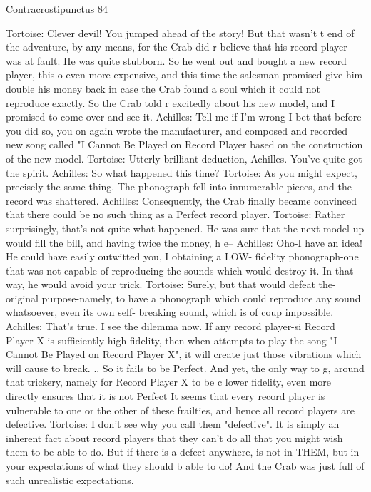 Contracrostipunctus                                                                       84

Tortoise: Clever devil! You jumped ahead of the story! But that wasn't t end of the
       adventure, by any means, for the Crab did r believe that his record player was at
       fault. He was quite stubborn. So he went out and bought a new record player, this
       o even more expensive, and this time the salesman promised give him double his
       money back in case the Crab found a soul which it could not reproduce exactly.
       So the Crab told r excitedly about his new model, and I promised to come over
       and see it.
Achilles: Tell me if I'm wrong-I bet that before you did so, you on again wrote the
       manufacturer, and composed and recorded new song called "I Cannot Be Played
       on Record Player based on the construction of the new model.
Tortoise: Utterly brilliant deduction, Achilles. You've quite got the spirit.
Achilles: So what happened this time?
Tortoise: As you might expect, precisely the same thing. The phonograph fell into
       innumerable pieces, and the record was shattered. Achilles: Consequently, the
       Crab finally became convinced that there could be no such thing as a Perfect
       record player.
Tortoise: Rather surprisingly, that's not quite what happened. He was sure that the next
       model up would fill the bill, and having twice the money, h e--
Achilles: Oho-I have an idea! He could have easily outwitted you, I obtaining a LOW-
       fidelity phonograph-one that was not capable of reproducing the sounds which
       would destroy it. In that way, he would avoid your trick.
Tortoise: Surely, but that would defeat the-original purpose-namely, to have a
       phonograph which could reproduce any sound whatsoever, even its own self-
       breaking sound, which is of coup impossible.
Achilles: That's true. I see the dilemma now. If any record player-si
Record Player X-is sufficiently high-fidelity, then when attempts to play the song "I
       Cannot Be Played on Record Player X", it will create just those vibrations which
       will cause to break. .. So it fails to be Perfect. And yet, the only way to g, around
       that trickery, namely for Record Player X to be c lower fidelity, even more
       directly ensures that it is not Perfect It seems that every record player is
       vulnerable to one or the other of these frailties, and hence all record players are
       defective.
Tortoise: I don't see why you call them "defective". It is simply an inherent fact about
       record players that they can't do all that you might wish them to be able to do. But
       if there is a defect anywhere, is not in THEM, but in your expectations of what
       they should b able to do! And the Crab was just full of such unrealistic
       expectations.




